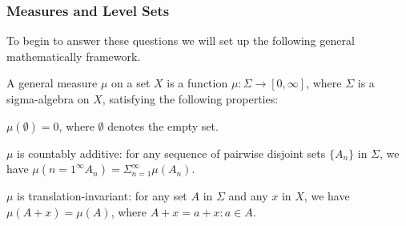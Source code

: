 \documentclass[12pt]{article} %
\theoremstyle{plain}
\begin{document}
	
	
	
	
	
	\subsubsection{Measures and Level Sets}
	
	To begin to answer these questions we will set up the following general mathematically framework.  
	
	A general measure $\mu$ on a set $X$ is a function $\mu : \Sigma \to [0, \infty]$, where $\Sigma$ is a sigma-algebra on $X$, satisfying the following properties:
	
	\begin{itemize} 
		
		{\setlength\itemindent{15pt} \item $\mu(\emptyset)= 0$, where $\emptyset$ denotes the empty set.}
		{\setlength\itemindent{15pt} \item $\mu$ is countably additive: for any sequence of pairwise disjoint sets $\{A_n\}$ in $\Sigma$, we have $\mu(n=1^{\infty} A_n) = \Sigma_{n=1}^{\infty} \mu(A_n)$.}
		{\setlength\itemindent{15pt} \item 	$\mu$ is translation-invariant: for any set $A$ in $\Sigma$ and any $x$ in $X$, we have $\mu(A + x) = \mu(A)$, where $A + x = {a + x : a \in A}$.}

	\end{itemize}
\end{document}
